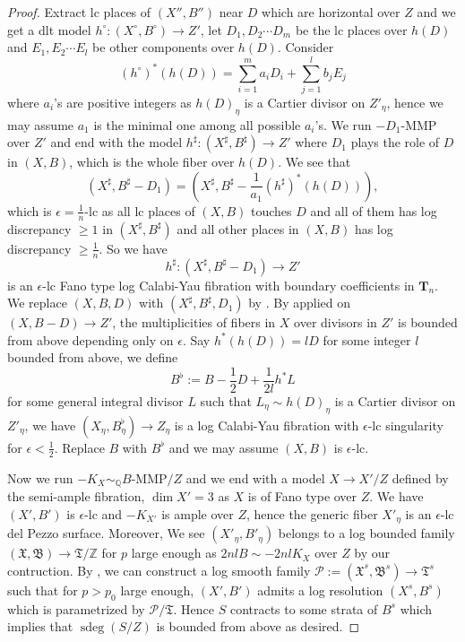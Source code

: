\documentclass[letterpaper,reqno,12pt]{amsart}
\DeclareMathOperator{\sdeg}{sdeg}
\numberwithin{equation}{section}
\theoremstyle{plain}
\begin{document}
\begin{proof}
    Extract lc places of $(X'',B'')$ near $D$ which are horizontal over $Z$ and we get a dlt model $h^\circ:(X^\circ,B^\circ)\to Z'$, let $D_1,D_2\cdots D_m$ be the lc places over $h(D)$ and $E_1,E_2\cdots E_l$ be other components over $h(D)$. Consider \[(h^\circ)^*(h(D))=\sum\limits_{i=1}^m a_i D_i+\sum\limits_{j=1}^l b_j E_j\] where $a_i$'s are positive integers as $h(D)_\eta$ is a Cartier divisor on $Z'_\eta$, hence we may assume $a_1$ is the minimal one among all possible $a_i$'s. We run $-D_1$-MMP over $Z'$ and end with the model $h^\sharp:(X^\sharp,B^\sharp)\to Z'$ where $D_1$ plays the role of $D$ in $(X,B)$, which is the whole fiber over $h(D)$. We see that \[(X^\sharp, B^\sharp-D_1)=(X^\sharp,B^\sharp-\frac{1}{a_1}(h^\sharp)^*(h(D))),\] 
    which is $\epsilon=\frac{1}{n}$-lc as all lc places of $(X,B)$ touches $D$ and all of them has log discrepancy $\geq 1$ in $(X^\sharp, B^\sharp)$ and all other places in $(X,B)$ has log discrepancy $\geq \frac{1}{n}$. So we have \[h^\sharp:(X^\sharp,B^\sharp-D_1)\to Z'\] is an $\epsilon$-lc Fano type log Calabi-Yau fibration with boundary coefficients in $\mathbf T_n$. We replace $(X,B, D)$ with $(X^\sharp, B^\sharp,D_1)$ by . By  applied on $(X,B-D)\to Z'$, the multiplicities of fibers in $X$ over divisors in $Z'$ is bounded from above depending only on $\epsilon$. Say $h^*(h(D))=lD$ for some integer $l$ bounded from above, we define \[B^\flat :=B-\frac{1}{2}D+\frac{1}{2l}h^*L\] for some general integral divisor $L$ such that $L_\eta\sim h(D)_\eta$ is a Cartier divisor on $Z'_\eta$, we have $(X_\eta,B_\eta^\flat)\to Z_\eta$ is a log Calabi-Yau fibration with $\epsilon$-lc singularity for $\epsilon<\frac{1}{2}$. Replace $B$ with $B^\flat$ and we may assume $(X,B)$ is $\epsilon$-lc.
    
    Now we run $-K_X\sim_\mathbb Q B$-MMP$/Z$ and we end with a model $X\to X'/Z$ defined by the semi-ample fibration, $\dim X'=3$ as $X$ is of Fano type over $Z$. We have $(X',B')$ is $\epsilon$-lc and $-K_{X'}$ is ample over $Z$, hence the generic fiber $X'_\eta$ is an $\epsilon$-lc del Pezzo surface. Moreover, We see $(X'_{\eta}, B'_\eta)$ belongs to a log bounded family $(\mathfrak X,\mathfrak B)\to \mathfrak T/\mathbb Z$ for $p$ large enough as $2nlB\sim -2nlK_X$ over $Z$ by our contruction. By , we can construct a log smooth family $\mathcal P:=(\mathfrak X^s,\mathfrak B^s)\to \mathfrak T^s$ such that for $p>p_0$ large enough, $(X',B')$ admits a log resolution $(X^s, B^s)$ which is parametrized by $\mathcal P/\mathfrak T$. Hence $S$ contracts to some strata of $B^s$ which implies that $\sdeg(S/Z)$ is bounded from above as desired.
    

\end{proof}
\end{document}
